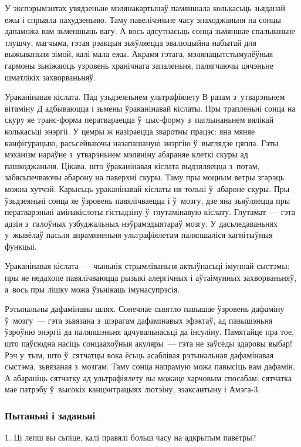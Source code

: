 У экспэрымэнтах увядзеньне мэлянакартынаў памяншала колькасьць зьяданай ежы і спрыяла пахудзеньню. Таму павелічэньне часу знаходжаньня на сонцы дапаможа вам зьменшыць вагу. А вось адсутнасьць сонца зьмяншае спальваньне тлушчу, магчыма, гэтая рэакцыя зьяўляецца эвалюцыйна набытай для выжываньня зімой, калі мала ежы. Акрамя гэтага, мэлянацытстымулёўныя гармоны зьніжаюць узровень хранічнага запаленьня, палягчаючы цячэньне шматлікіх захворваньняў. 

Ураканінавая кіслата. Пад узьдзеяньнем ультрафіялету В разам з~утварэньнем вітаміну Д адбываюцца і зьмены ўраканінавай кіслаты. Пры трапленьні сонца на скуру яе транс-форма ператвараецца ў~цыс-форму з~паглынаньнем вялікай колькасьці энэргіі. У цемры ж назіраецца зваротны працэс: яна мяняе канфігурацыю, расьсейваючы назапашаную энэргію ў~выглядзе цяпла. Гэты мэханізм нараўне з~утварэньнем мэляніну абараняе клеткі скуры ад пашкоджаньня. Цікава, што ўраканінавая кіслата выдзяляецца з~потам, забясьпечваючы абарону на паверхні скуры. Таму пры моцным ветры згарэць можна хутчэй. Карысьць ураканінавай кіслаты ня толькі ў~абароне скуры. Пры ўзьдзеяньні сонца яе ўзровень павялічваецца і ў~мозгу, дзе яна зьяўляецца пры ператварэньні амінакіслоты гістыдзіну ў~глутамінавую кіслату. Глутамат~--- гэта адзін з~галоўных узбуджальных нэўрамэдыятараў мозгу. У дасьледаваньнях у~жывёлаў пасьля апрамяненьня ультрафіялетам паляпшаліся кагнітыўныя функцыі. 

Ураканінавая кіслата~--- чыньнік стрымліваньня актыўнасьці імуннай сыстэмы: пры яе недахопе павялічваюцца рызыкі алергічных і аўтаімунных захворваньняў, а~вось пры лішку можа ўзьнікаць імунасупрэсія. 

Рэтынальны дафамінавы шлях. Сонечнае сьвятло павышае ўзровень дафаміну ў~мозгу~--- гэта зьвязана з~шэрагам дафамінавых эфэктаў, ад павышэньня ўзроўню энэргіі да паляпшэньня адчувальнасьці да інсуліну. Памятайце пра тое, што паўсюдна насіць сонцаахоўныя акуляры~--- гэта не заўсёды здаровы выбар! Рэч у~тым, што ў~сятчатцы вока ёсьць асаблівая рэтынальная дафамінавая сыстэма, зьвязаная з~мозгам. Таму сонца напрамую можа павысіць вам дафамін. А абараніць сятчатку ад ультрафіялету вы можаце харчовым спосабам: сятчатка мае патрэбу ў~высокіх канцэнтрацыях лютэіну, зэаксантыну і Амэга-3.

\subsubsection{Пытаньні і заданьні}

1. Ці лепш вы сьпіце, калі правялі больш часу на адкрытым паветры?

